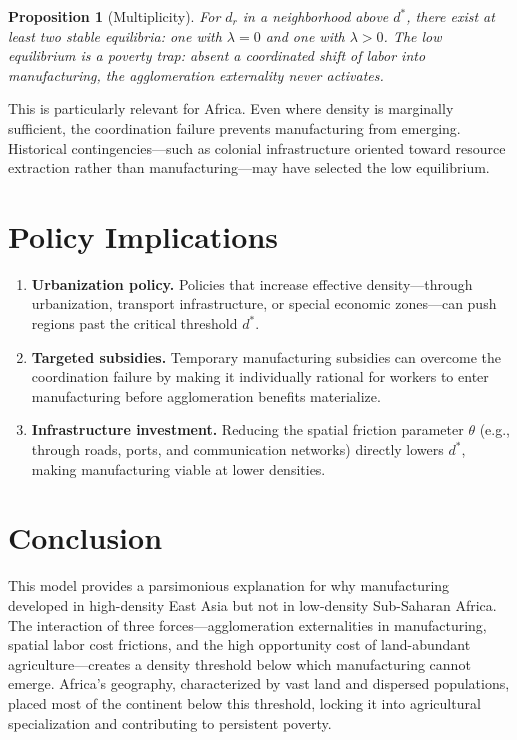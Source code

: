 \documentclass[12pt]{article}
\newtheorem{proposition}{Proposition}
\begin{document}
\begin{proposition}[Multiplicity]
For $d_r$ in a neighborhood above $d^*$, there exist at least two stable equilibria: one with $\lambda = 0$ and one with $\lambda > 0$. The low equilibrium is a poverty trap: absent a coordinated shift of labor into manufacturing, the agglomeration externality never activates.
\end{proposition}

This is particularly relevant for Africa. Even where density is marginally sufficient, the coordination failure prevents manufacturing from emerging. Historical contingencies---such as colonial infrastructure oriented toward resource extraction rather than manufacturing---may have selected the low equilibrium.

\section{Policy Implications}

\begin{enumerate}
    \item \textbf{Urbanization policy.} Policies that increase effective density---through urbanization, transport infrastructure, or special economic zones---can push regions past the critical threshold $d^*$.

    \item \textbf{Targeted subsidies.} Temporary manufacturing subsidies can overcome the coordination failure by making it individually rational for workers to enter manufacturing before agglomeration benefits materialize.

    \item \textbf{Infrastructure investment.} Reducing the spatial friction parameter $\theta$ (e.g., through roads, ports, and communication networks) directly lowers $d^*$, making manufacturing viable at lower densities.
\end{enumerate}

\section{Conclusion}

This model provides a parsimonious explanation for why manufacturing developed in high-density East Asia but not in low-density Sub-Saharan Africa. The interaction of three forces---agglomeration externalities in manufacturing, spatial labor cost frictions, and the high opportunity cost of land-abundant agriculture---creates a density threshold below which manufacturing cannot emerge. Africa's geography, characterized by vast land and dispersed populations, placed most of the continent below this threshold, locking it into agricultural specialization and contributing to persistent poverty.
\end{document}
